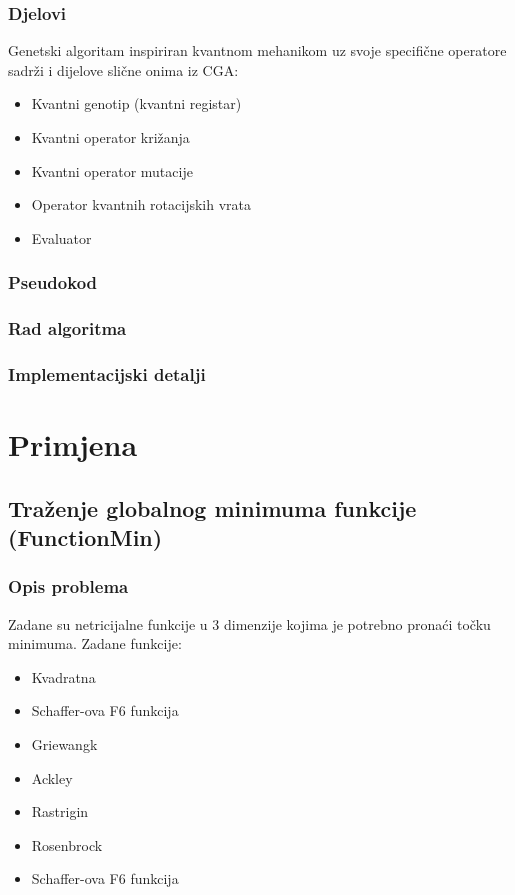 \documentclass[times, utf8, zavrsni]{fer}
\begin{document}
\subsection{Djelovi}
Genetski algoritam inspiriran kvantnom mehanikom uz svoje specifične operatore sadrži i dijelove slične onima iz CGA:
\begin{itemize}
\item Kvantni genotip (kvantni registar)
\item Kvantni operator križanja 
\item Kvantni operator mutacije
\item Operator kvantnih rotacijskih vrata
\item Evaluator
\end{itemize}
\subsection{Pseudokod}
\subsection{Rad algoritma}
\subsection{Implementacijski detalji}


\chapter{Primjena}

\section{Traženje globalnog minimuma funkcije (FunctionMin)}
\subsection{Opis problema}
Zadane su netricijalne funkcije u 3 dimenzije kojima je potrebno pronaći točku minimuma.
Zadane funkcije:
\begin{itemize}
\item Kvadratna
\item Schaffer-ova F6 funkcija
\item Griewangk
\item Ackley
\item Rastrigin
\item Rosenbrock
\item Schaffer-ova F6 funkcija
\end{itemize}
\end{document}
